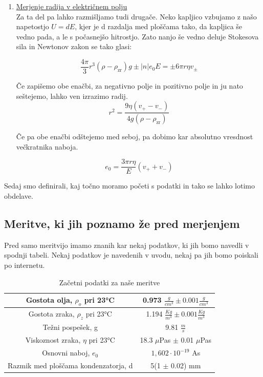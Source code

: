 \documentclass[11pt, a4paper]{article}
\theoremstyle{definition}
\theoremstyle{example}
\theoremstyle{izrek}
\begin{document}
\begin{enumerate}
\item \underline{Merjenje radija v električnem polju}\\
Za ta del pa lahko razmišljamo tudi drugače. Neko kapljico vzbujamo z našo napetostjo $U=dE$, kjer je d razdalja med ploščama tako, da kapljica še vedno pada, a le s počasnejšo hitrostjo. Zato nanjo še vedno deluje Stokesova sila in Newtonov zakon se tako glasi:

$$\frac{4 \pi}{3} r^{3}\left(\rho-\rho_{\mathrm{zr}}\right) g \pm|n| e_{0} E=\pm 6 \pi r \eta v_{\pm}$$

Če zapišemo obe enačbi, za negativno polje in pozitivno polje in ju nato seštejemo, lahko ven izrazimo radij. 
\begin{equation}
r^{2}=\frac{9 \eta\left(v_{+}-v_{-}\right)}{4 g\left(\rho-\rho_{\mathrm{zr}}\right)}
\label{Radij, električno polje}
\end{equation}


Če pa obe enačbi odštejemo med seboj, pa dobimo kar absolutno vresdnost večkratnika naboja. 

\begin{equation}
e_0=\frac{3\pi r \eta}{E}(v_++v_-)
\label{Naboj v električnem}
\end{equation}
\end{enumerate}

Sedaj smo definirali, kaj točno moramo početi s podatki in tako se lahko lotimo obdelave. 

\subsection{Meritve, ki jih poznamo že pred merjenjem}
Pred samo meritvijo imamo znanih kar nekaj podatkov, ki jih bomo navedli v spodnji tabeli. Nekaj podatkov je navedenih v uvodu, nekaj pa jih bomo poiskali po internetu.
\begin{table}[h]
	\centering
	\begin{tabular}{|c|c|}
		\hline
		Gostota olja, $\rho_o$ pri 23°C & 0.973 $\frac{g}{{cm}^3} \pm 0.001\frac{g}{{cm}^3}$ \\ [1ex]
		\hline
		Gostota zraka, $\rho_z$ pri 23°C & 1.194 $\frac{Kg}{{m}^3} \pm 0.001\frac{Kg}{{m}^3}$  \\[1ex]
		\hline
		Težni pospešek, g & 9.81 $\frac{m}{s}$ \\[1ex]
		\hline
		Viskoznost zraka, $\eta$ pri 23°C & 18.3 $\mu$Pas $\pm$ 0.01 $\mu$Pas \\[1ex]
		\hline
		Osnovni naboj, $e_0$ &  $1,602 \cdot 10^{-19}$ As \\[1ex]
		\hline
		Razmik med ploščama kondenzatorja, d & 5(1 $\pm$ 0.02) mm \\[1ex]
		\hline
	\end{tabular}
	\caption{Začetni podatki za naše meritve}		\label{osnove}
\end{table}
\end{document}
